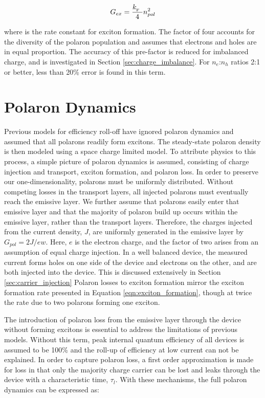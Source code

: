 \documentclass[../thesis.tex]{subfiles}
\begin{document}
\begin{equation}
G_{ex}=\frac{k_{_\text{\tiny F}}\ }{4}n_{pol}^2
\label{eqn:exciton_formation}
\end{equation}

where \kf is the rate constant for exciton formation.  The factor of four accounts for the diversity of the polaron population and assumes that electrons and holes are in equal proportion.  
The accuracy of this pre-factor is reduced for imbalanced charge, and is investigated in Section \ref{sec:charge_imbalance}.
For $n_e$:$n_h$ ratios 2:1 or better, less than 20\% error is found in this term.  

\section{Polaron Dynamics}

Previous models for efficiency roll-off have ignored polaron dynamics and assumed that all polarons readily form excitons.  The steady-state polaron density is then modeled using a space charge limited model.\supercite{Pope1999}
To attribute physics to this process, a simple picture of polaron dynamics is assumed, consisting of charge injection and transport, exciton formation, and polaron loss.  
In order to preserve our one-dimensionality, polarons must be uniformly distributed.  
Without competing losses in the transport layers, all injected polarons must eventually reach the emissive layer.  
We further assume that polarons easily enter that emissive layer and that the majority of polaron build up occurs within the emissive layer, rather than the transport layers.
Therefore, the charges injected from the current density, $J$, are uniformly generated in the emissive layer by $G_{pol}=2J/ew$.  Here, $e$ is the electron charge, and the factor of two arises from an assumption of equal charge injection.  In a well balanced device, the measured current forms holes on one side of the device and electrons on the other, and are both injected into the device.  
This is discussed extensively in Section \ref{sec:carrier_injection}
Polaron losses to exciton formation mirror the exciton formation rate presented in Equation \ref{eqn:exciton_formation}, though at twice the rate due to two polarons forming one exciton.

The introduction of polaron loss from the emissive layer through the device without forming excitons is essential to address the limitations of previous models.  
Without this term, peak internal quantum efficiency of all devices is assumed to be 100\% and the roll-up of efficiency at low current can not be explained.  
In order to capture polaron loss, a first order approximation is made for loss in that only the majority charge carrier can be lost and leaks through the device with a characteristic time, $\tau_l$.
With these mechanisms, the full polaron dynamics can be expressed as:
\end{document}
